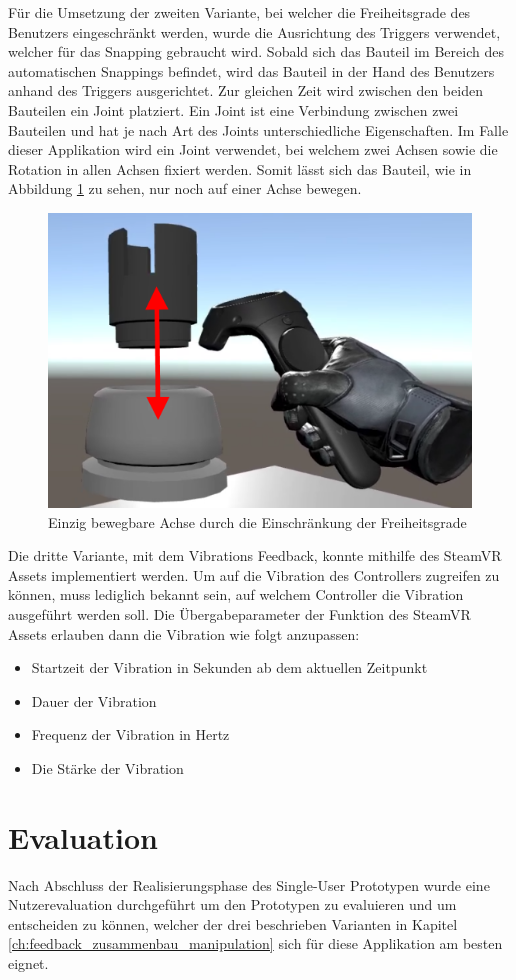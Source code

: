 \bigskip
Für die Umsetzung der zweiten Variante, bei welcher die Freiheitsgrade des Benutzers eingeschränkt werden, wurde die Ausrichtung des Triggers verwendet, welcher für das Snapping gebraucht wird. Sobald sich das Bauteil im Bereich des automatischen Snappings befindet, wird das Bauteil in der Hand des Benutzers anhand des Triggers ausgerichtet. Zur gleichen Zeit wird zwischen den beiden Bauteilen ein Joint platziert. Ein Joint ist eine Verbindung zwischen zwei Bauteilen und hat je nach Art des Joints unterschiedliche Eigenschaften. Im Falle dieser Applikation wird ein Joint verwendet, bei welchem zwei Achsen sowie die Rotation in allen Achsen fixiert werden. Somit lässt sich das Bauteil, wie in Abbildung \ref{fig:einschraenkung_freiheitsgrade} zu sehen, nur noch auf einer Achse bewegen.

\begin{figure}[h!]
	\centering
	\includegraphics[keepaspectratio,width=0.4\linewidth]{img/Einschraenkung_Freiheitsgrade.PNG}
	\caption{Einzig bewegbare Achse durch die Einschränkung der Freiheitsgrade}
	\label{fig:einschraenkung_freiheitsgrade}
\end{figure}

Die dritte Variante, mit dem Vibrations Feedback, konnte mithilfe des SteamVR Assets implementiert werden. Um auf die Vibration des Controllers zugreifen zu können, muss lediglich bekannt sein, auf welchem Controller die Vibration ausgeführt werden soll. Die Übergabeparameter der Funktion des SteamVR Assets erlauben dann die Vibration wie folgt anzupassen:

\begin{itemize} [itemsep=1pt,topsep=0pt]
	\item Startzeit der Vibration in Sekunden ab dem aktuellen Zeitpunkt
	\item Dauer der Vibration
	\item Frequenz der Vibration in Hertz
	\item Die Stärke der Vibration
\end{itemize}

\pagebreak
\section{Evaluation}
Nach Abschluss der Realisierungsphase des Single-User Prototypen wurde eine Nutzerevaluation durchgeführt um den Prototypen zu evaluieren und um entscheiden zu können, welcher der drei beschrieben Varianten in Kapitel \ref{ch:feedback_zusammenbau_manipulation} sich für diese Applikation am besten eignet. 

